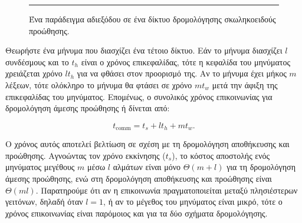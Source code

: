 \documentclass[12pt,a4paper]{article}
\begin{document}
\begin{figure}[H]
\noindent\rule{\textwidth}{0.2pt}
\caption{Ένα παράδειγμα αδιεξόδου σε ένα δίκτυο δρομολόγησης σκωληκοειδούς προώθησης.}
\label{fig:graph54}
\end{figure}
\vspace{0.3cm}

Θεωρήστε ένα μήνυμα που διασχίζει ένα τέτοιο δίκτυο. Εάν το μήνυμα
διασχίζει $l$ συνδέσμους και το $t_h$ είναι ο χρόνος επικεφαλίδας, τότε η 
κεφαλίδα του μηνύματος χρειάζεται χρόνο $l t_h$ για να φθάσει στον 
προορισμό της. Αν το μήνυμα έχει μήκος $m$ λέξεων, τότε ολόκληρο το μήνυμα
θα φτάσει σε χρόνο $mt_w$ μετά την άφιξη της επικεφαλίδας του μηνύματος.
Επομένως, ο συνολικός χρόνος επικοινωνίας για δρομολόγηση άμεσης προώθησης ή
δίνεται από:

\[
t_{\text{comm}} = t_s + lt_h + mt_w.
\]

\noindent Ο χρόνος αυτός αποτελεί βελτίωση σε σχέση με τη δρομολόγηση
αποθήκευσης και προώθησης. Αγνοώντας τον χρόνο εκκίνησης ($t_s$), το 
κόστος αποστολής ενός μηνύματος μεγέθους $m$ μέσω $l$ αλμάτων είναι μόνο 
$\Theta(m+l)$ για τη δρομολόγηση άμεσης προώθησης, ενώ στη δρομολόγηση
αποθήκευσης και προώθησης είναι $\Theta(ml)$. Παρατηρούμε ότι αν η 
επικοινωνία πραγματοποιείται μεταξύ πλησιέστερων γειτόνων, δηλαδή όταν 
$l=1$, ή αν το μέγεθος του μηνύματος είναι μικρό, τότε ο χρόνος 
επικοινωνίας είναι παρόμοιος και για τα δύο σχήματα δρομολόγησης.
\end{document}
